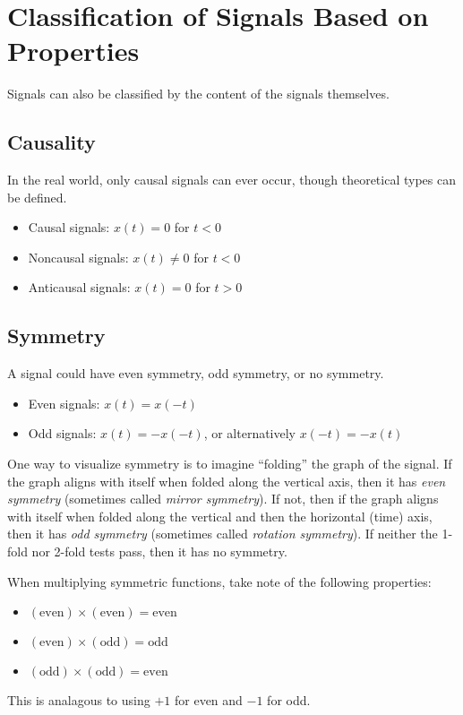 \documentclass{report}
\begin{document}
\section{Classification of Signals Based on Properties}
Signals can also be classified by the content of the signals themselves. 

\subsection{Causality}
In the real world, only causal signals  can ever occur, though theoretical types can be defined.
\begin{tcolorbox}[width=\textwidth,colback={white}, sharp corners]
    \begin{itemize}
        \item Causal signals: $x(t)=0$ for $t<0$
        \item Noncausal signals: $x(t)\neq 0$ for $t<0$
        \item Anticausal signals: $x(t)=0$ for $t>0$
    \end{itemize}
\end{tcolorbox}

\subsection{Symmetry}
A signal could have even symmetry, odd symmetry, or no symmetry.
\begin{tcolorbox}[width=\textwidth,colback={white}, sharp corners]
    \begin{itemize}
        \item Even signals: $x(t)=x(-t)$
        \item Odd signals: $x(t)=-x(-t)$, or alternatively $x(-t)=-x(t)$
    \end{itemize}
\end{tcolorbox}

One way to visualize symmetry is to imagine ``folding'' the graph of the signal. If the graph aligns with itself when 
folded along the vertical axis, then it has \emph{even symmetry} (sometimes called \emph{mirror symmetry}). If not, then 
if the graph aligns with itself when folded along the vertical and then the horizontal (time) axis, then it has 
\emph{odd symmetry} (sometimes called \emph{rotation symmetry}). If neither the 1-fold nor 2-fold tests pass, 
then it has no symmetry.

\begin{tcolorbox}[width=\textwidth,colback={white}, sharp corners]
    When multiplying symmetric functions, take note of the following properties:
    \begin{itemize}
        \item $(\text{even}) \times (\text{even}) = \text{even}$
        \item $(\text{even}) \times (\text{odd}) = \text{odd}$
        \item $(\text{odd}) \times (\text{odd}) = \text{even}$
    \end{itemize}
    This is analagous to using $+1$ for even and $-1$ for odd.
\end{tcolorbox}
\end{document}
